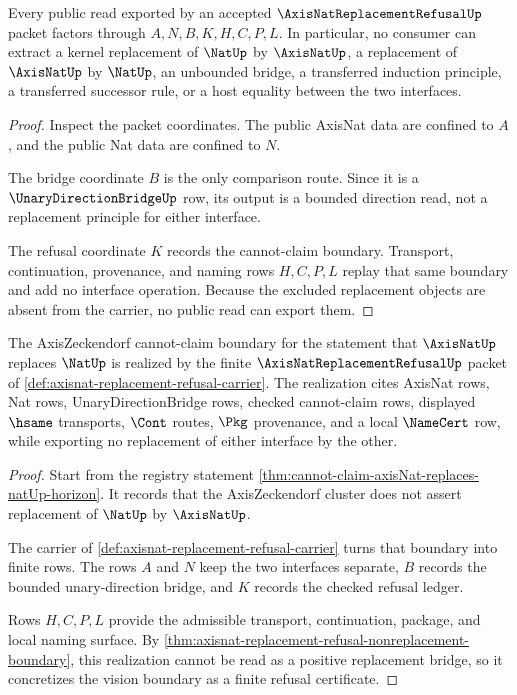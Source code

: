 \begin{theorem}
\label{thm:axisnat-replacement-refusal-nonreplacement-boundary}
Every public read exported by an accepted $\AxisNatReplacementRefusalUp$ packet factors through $A,N,B,K,H,C,P,L$. In particular, no consumer can extract a kernel replacement of $\NatUp$ by $\AxisNatUp$, a replacement of $\AxisNatUp$ by $\NatUp$, an unbounded bridge, a transferred induction principle, a transferred successor rule, or a host equality between the two interfaces.
\end{theorem}
\begin{proof}
Inspect the packet coordinates. The public AxisNat data are confined to $A$, and the public Nat data are confined to $N$.

The bridge coordinate $B$ is the only comparison route. Since it is a $\UnaryDirectionBridgeUp$ row, its output is a bounded direction read, not a replacement principle for either interface.

The refusal coordinate $K$ records the cannot-claim boundary. Transport, continuation, provenance, and naming rows $H,C,P,L$ replay that same boundary and add no interface operation. Because the excluded replacement objects are absent from the carrier, no public read can export them.
\end{proof}

\begin{theorem}
\label{thm:axisnat-replacement-refusal-vision-realization}
The AxisZeckendorf cannot-claim boundary for the statement that $\AxisNatUp$ replaces $\NatUp$ is realized by the finite $\AxisNatReplacementRefusalUp$ packet of \autoref{def:axisnat-replacement-refusal-carrier}. The realization cites AxisNat rows, Nat rows, UnaryDirectionBridge rows, checked cannot-claim rows, displayed $\hsame$ transports, $\Cont$ routes, $\Pkg$ provenance, and a local $\NameCert$ row, while exporting no replacement of either interface by the other.
\end{theorem}
\begin{proof}
Start from the registry statement \autoref{thm:cannot-claim-axisNat-replaces-natUp-horizon}. It records that the AxisZeckendorf cluster does not assert replacement of $\NatUp$ by $\AxisNatUp$.

The carrier of \autoref{def:axisnat-replacement-refusal-carrier} turns that boundary into finite rows. The rows $A$ and $N$ keep the two interfaces separate, $B$ records the bounded unary-direction bridge, and $K$ records the checked refusal ledger.

Rows $H,C,P,L$ provide the admissible transport, continuation, package, and local naming surface. By \autoref{thm:axisnat-replacement-refusal-nonreplacement-boundary}, this realization cannot be read as a positive replacement bridge, so it concretizes the vision boundary as a finite refusal certificate.
\end{proof}

